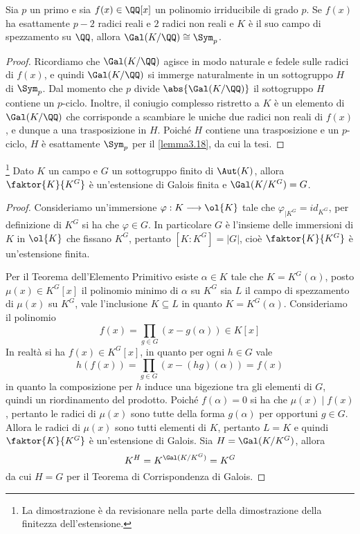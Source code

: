 \documentclass[11pt]{scrartcl}
\begin{document}
	\begin{lemma}
		\label{lemma3.19}
		Sia $p$ un primo e sia $f(x) \in \QQ[x]$ un polinomio irriducibile di grado
		$p$. Se $f(x)$ ha esattamente $p - 2$ radici reali e $2$ radici non reali
		e $K$ è il suo campo di spezzamento su $\QQ$, allora $\Gal(K/\QQ) \cong \Sym_p$.
	\end{lemma}
	
	\begin{proof}
		Ricordiamo che $\Gal(K/\QQ)$ agisce in modo naturale e fedele sulle radici di
		$f(x)$, e quindi $\Gal(K/\QQ)$ si immerge naturalmente in un sottogruppo
		$H$ di
		$\Sym_p$. Dal momento che $p$ divide $\abs{\Gal(K/\QQ)}$ il sottogruppo $H$
		contiene
		un $p$-ciclo. Inoltre, il coniugio complesso ristretto a $K$ è
		un elemento di $\Gal(K/\QQ)$ che corrisponde a scambiare le uniche due
		radici non reali di $f(x)$, e dunque a una trasposizione in $H$. Poiché
		$H$ contiene una trasposizione e un $p$-ciclo,
		$H$ è esattamente $\Sym_p$ per il \autoref{lemma3.18}, da cui la tesi.
	\end{proof}
	
	\begin{lemma}
		\footnote{
			La dimostrazione è da revisionare nella parte della dimostrazione 
			della finitezza dell'estensione.
		}
		\label{lemma3.20}
		Dato $K$ un campo e $G$ un sottogruppo finito di $\Aut(K)$, allora 
		$\faktor{K}{K^G}$ è un'estensione di Galois finita e $\Gal(K/K^G) = G$.
	\end{lemma}
	
	\begin{proof}
		Consideriamo un'immersione $\varphi: K \longrightarrow \ol{K}$ tale che
		$\varphi_{\mid K^G} = id_{K^G}$, per definizione di $K^G$ si ha che 
		$\varphi \in G$. In particolare $G$ è l'insieme delle immersioni di $K$
		in $\ol{K}$ che fissano $K^G$, pertanto $[K:K^G] = |G|$, cioè $\faktor{K}{K^G}$
		è un'estensione finita. 
		
		Per il Teorema dell'Elemento Primitivo esiste $\alpha \in K$ tale che 
		$K = K^G(\alpha)$, posto $\mu(x) \in K^G[x]$ il polinomio minimo di $\alpha$
		su $K^G$ sia $L$ il campo di spezzamento di $\mu(x)$ su $K^G$, vale
		l'inclusione $K \subseteq L$ in quanto $K = K^G(\alpha)$. Consideriamo 
		il polinomio 
		\[
		f(x) = \prod_{g \in G}(x - g(\alpha)) \in K[x]
		\]
		In realtà si ha $f(x) \in K^G[x]$, in quanto per ogni $h \in G$ vale 
		\[
		h(f(x)) = \prod_{g \in G}(x - (hg)(\alpha)) = f(x)
		\]
		in quanto la composizione per $h$ induce una bigezione tra gli elementi di $G$,
		quindi un riordinamento del prodotto. Poiché $f(\alpha) = 0$ si ha che
		$\mu(x)\mid f(x)$, pertanto le radici di $\mu(x)$ sono tutte della forma
		$g(\alpha)$ per opportuni $g \in G$. Allora le radici di $\mu(x)$ sono
		tutti elementi di $K$, pertanto $L = K$ e quindi $\faktor{K}{K^G}$ è 
		un'estensione di Galois. Sia $H = \Gal(K/K^G)$, allora
		\[
		K^H = K^{\Gal(K/K^G)} = K^G
		\]
		da cui $H = G$ per il Teorema di Corrispondenza di Galois.
	\end{proof}
	
\end{document}
